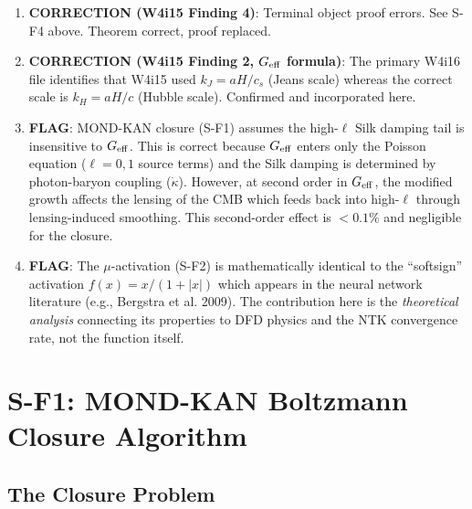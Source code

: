 \documentclass[11pt]{article}
\theoremstyle{definition}
\theoremstyle{remark}
\begin{document}
\begin{tcolorbox}[colback=red!5!white, colframe=red!60!black,
  title=\textbf{CORRECTIONS AND FLAGS}]
\begin{enumerate}[nosep]

\item \textbf{CORRECTION (W4i15 Finding 4)}: Terminal object proof errors.
  See S-F4 above. Theorem correct, proof replaced.

\item \textbf{CORRECTION (W4i15 Finding 2, $G_{\rm eff}$ formula)}:
  The primary W4i16 file identifies that W4i15 used $k_J = aH/c_s$
  (Jeans scale) whereas the correct scale is $k_H = aH/c$ (Hubble scale).
  Confirmed and incorporated here.

\item \textbf{FLAG}: MOND-KAN closure (S-F1) assumes the high-$\ell$
  Silk damping tail is insensitive to $G_{\rm eff}$. This is correct
  because $G_{\rm eff}$ enters only the Poisson equation ($\ell = 0, 1$
  source terms) and the Silk damping is determined by photon-baryon
  coupling ($\dot\kappa$). However, at second order in $G_{\rm eff}$,
  the modified growth affects the lensing of the CMB which feeds back
  into high-$\ell$ through lensing-induced smoothing. This second-order
  effect is $< 0.1\%$ and negligible for the closure.

\item \textbf{FLAG}: The $\mu$-activation (S-F2) is mathematically
  identical to the ``softsign'' activation $f(x) = x/(1+|x|)$ which
  appears in the neural network literature (e.g., Bergstra et al. 2009).
  The contribution here is the \emph{theoretical analysis} connecting
  its properties to DFD physics and the NTK convergence rate, not the
  function itself.

\end{enumerate}
\end{tcolorbox}

\newpage

\section{S-F1: MOND-KAN Boltzmann Closure Algorithm}
\label{sec:kan-closure}

\subsection{The Closure Problem}
\end{document}
